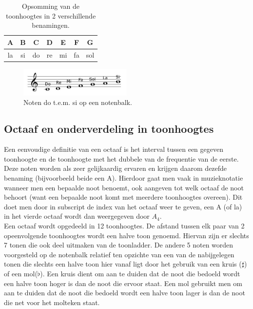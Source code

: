 \begin{table}
  \centering
  \begin{tabular}{ c c c c c c c }
    A & B & C & D & E & F & G \\
    \hline
    \hline
    la & si & do & re & mi & fa & sol \\
  \end{tabular}
  \caption{Opsomming van de toonhoogtes in 2 verschillende benamingen.}
  \label{tabel:toonhoogte}
\end{table}

\begin{figure}[!ht]
  \centering
  \includegraphics[width=0.5\textwidth]{1_Muzikale_Achtergrond/toonladder}
  \caption{Noten do t.e.m. si op een notenbalk.}
  \label{figuur:toonladder}
\end{figure}

\subsection{Octaaf en onderverdeling in toonhoogtes}
Een eenvoudige definitie van een octaaf is het interval tussen een gegeven toonhoogte en de toonhoogte met het dubbele van de frequentie van de eerste. Deze noten worden als zeer gelijkaardig ervaren en krijgen daarom dezefde benaming (bijvoorbeeld beide een A). Hierdoor gaat men vaak in muzieknotatie wanneer men een bepaalde noot benoemt, ook aangeven tot welk octaaf de noot behoort (want een bepaalde noot komt met meerdere toonhoogtes overeen). Dit doet men door in subscript de index van het octaaf weer te geven, een A (of la) in het vierde octaaf wordt dan weergegeven door $A_{4}$.\\
Een octaaf wordt opgedeeld in 12 toonhoogtes. De afstand tussen elk paar van 2 opeenvolgende toonhoogtes wordt een halve toon genoemd. Hiervan zijn er slechts 7 tonen die ook deel uitmaken van de toonladder. De andere 5 noten worden voorgesteld op de notenbalk relatief ten opzichte van een van de nabijgelegen tonen die slechts een halve toon hier vanaf ligt door het gebruik van een kruis ($\sharp$) of een mol($\flat$). Een kruis dient om aan te duiden dat de noot die bedoeld wordt een halve toon hoger is dan de noot die ervoor staat. Een mol gebruikt men om aan te duiden dat de noot die bedoeld wordt een halve toon lager is dan de noot die net voor het molteken staat.

